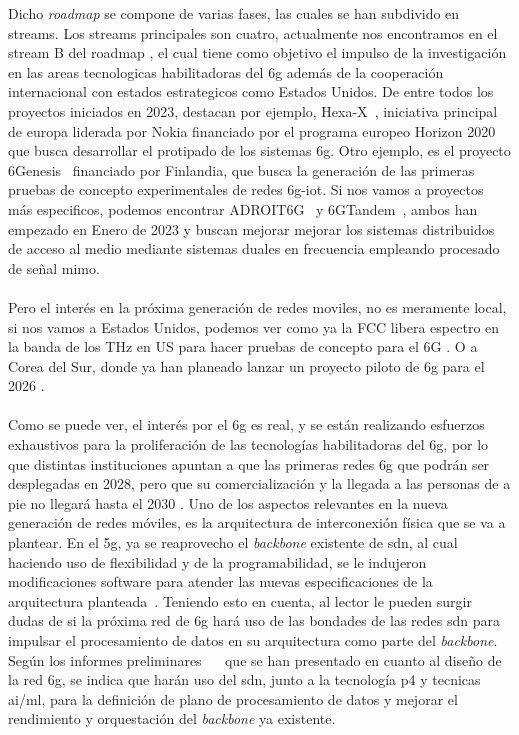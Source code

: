 Dicho \textit{roadmap} se compone de varias fases, las cuales se han subdivido en streams. Los streams principales son cuatro, actualmente nos encontramos en el stream B del roadmap \cite{eu6GFase2}, el cual tiene como objetivo el impulso de la investigación en las areas tecnologicas habilitadoras del \gls{6g} además de la cooperación internacional con estados estrategicos como Estados Unidos. De entre todos los proyectos iniciados en 2023, destacan por ejemplo, Hexa-X~\cite{9482430}, iniciativa principal de europa liderada por Nokia financiado por el programa europeo Horizon 2020 que busca desarrollar el protipado de los sistemas \gls{6g}. Otro ejemplo, es el proyecto 6Genesis~\cite{Katz2019} financiado por Finlandia, que busca la generación de las primeras pruebas de concepto experimentales de redes \gls{6g}-\gls{iot}. Si nos vamos a proyectos más especificos, podemos encontrar ADROIT6G~\cite{ADROIT6G} y 6GTandem~\cite{6GTandem}, ambos han empezado en Enero de 2023 y buscan mejorar mejorar los sistemas distribuidos de acceso al medio mediante sistemas duales en frecuencia empleando procesado de señal \gls{mimo}.\\
\\
Pero el interés en la próxima generación de redes moviles, no es meramente local, si nos vamos a Estados Unidos, podemos ver como ya la FCC libera espectro en la banda de los THz en US para hacer pruebas de concepto para el 6G \cite{us6g}. O a Corea del Sur, donde ya han planeado lanzar un proyecto piloto de \gls{6g} para el 2026 \cite{coreaSur6G}.\\
\\
Como se puede ver, el interés por el \gls{6g} es real, y se están realizando esfuerzos exhaustivos para la proliferación de las tecnologías habilitadoras del \gls{6g}, por lo que distintas instituciones apuntan a que las primeras redes \gls{6g} que podrán ser desplegadas en 2028, pero que su comercialización y la llegada a las personas de a pie no llegará hasta el 2030 \cite{Nguyen2022}. Uno de los aspectos relevantes en la nueva generación de redes móviles, es la arquitectura de interconexión física que se va a plantear. En el \gls{5g}, ya se reaprovecho el \textit{backbone} existente de \gls{sdn}, al cual haciendo uso de flexibilidad y de la programabilidad,  se le indujeron modificaciones software para atender las nuevas especificaciones de la arquitectura planteada~\cite{Li2018}. Teniendo esto en cuenta, al lector le pueden surgir dudas de si la próxima red de \gls{6g} hará uso de las bondades de las redes \gls{sdn} para impulsar el procesamiento de datos en su arquitectura como parte del \textit{backbone}. Según los informes preliminares \cite{Uusitalo2021}~\cite{6garch1}~\cite{6garch2} que se han presentado en cuanto al diseño de la red \gls{6g}, se indica que harán uso del \gls{sdn},  junto a la tecnología \gls{p4} y tecnicas \gls{ai}/\gls{ml}, para la definición de plano de procesamiento de datos y mejorar el rendimiento y orquestación del \textit{backbone} ya existente.\\


